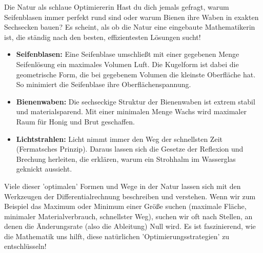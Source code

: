 \begin{funfactbox}{Die Natur als schlaue Optimiererin}
Hast du dich jemals gefragt, warum Seifenblasen immer perfekt rund sind oder warum Bienen ihre Waben in exakten Sechsecken bauen? Es scheint, als ob die Natur eine eingebaute Mathematikerin ist, die ständig nach den besten, effizientesten Lösungen sucht!

\begin{itemize}
    \item \textbf{Seifenblasen:} Eine Seifenblase umschließt mit einer gegebenen Menge Seifenlösung ein maximales Volumen Luft. Die Kugelform ist dabei die geometrische Form, die bei gegebenem Volumen die kleinste Oberfläche hat. So minimiert die Seifenblase ihre Oberflächenspannung.
    \item \textbf{Bienenwaben:} Die sechseckige Struktur der Bienenwaben ist extrem stabil und materialsparend. Mit einer minimalen Menge Wachs wird maximaler Raum für Honig und Brut geschaffen.
    \item \textbf{Lichtstrahlen:} Licht nimmt immer den Weg der schnellsten Zeit (Fermatsches Prinzip). Daraus lassen sich die Gesetze der Reflexion und Brechung herleiten, die erklären, warum ein Strohhalm im Wasserglas geknickt aussieht.
\end{itemize}
Viele dieser 'optimalen' Formen und Wege in der Natur lassen sich mit den Werkzeugen der Differentialrechnung beschreiben und verstehen. Wenn wir zum Beispiel das Maximum oder Minimum einer Größe suchen (maximale Fläche, minimaler Materialverbrauch, schnellster Weg), suchen wir oft nach Stellen, an denen die Änderungsrate (also die Ableitung) Null wird. Es ist faszinierend, wie die Mathematik uns hilft, diese natürlichen 'Optimierungsstrategien' zu entschlüsseln!


\end{funfactbox}

